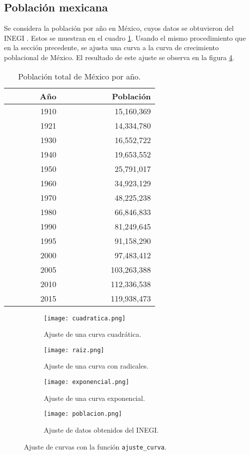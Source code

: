 \documentclass[12pt,letterpaper]{article}
\begin{document}
\subsection{Población mexicana}
Se considera la población por año en México, cuyos datos se obtuvieron del INEGI \cite{inegi}. Estos se muestran en el cuadro \ref{ine}. Usando el mismo procedimiento que en la sección precedente, se ajusta una curva a la curva de crecimiento poblacional de México. El resultado de este ajuste se observa en la figura \ref{pob}.
\begin{table}
\centering
\caption{Población total de México por año.}
\begin{tabular}{rr}
  \hline
 $\qquad \qquad$Año & $\qquad \qquad \qquad$Población \\ 
  \hline
 1910 & 15,160,369 \\ 
 1921 & 14,334,780 \\ 
 1930 & 16,552,722 \\ 
 1940 & 19,653,552 \\ 
 1950 & 25,791,017 \\ 
 1960 & 34,923,129 \\ 
 1970 & 48,225,238 \\ 
 1980 & 66,846,833 \\ 
 1990 & 81,249,645 \\ 
 1995 & 91,158,290\\ 
 2000 & 97,483,412 \\ 
 2005 & 103,263,388 \\ 
 2010 & 112,336,538 \\ 
 2015 & 119,938,473 \\ 
   \hline
\end{tabular}
\label{ine}
\end{table}

\begin{figure}
 	\centering 
 	\begin{subfigure}[b]{0.45\linewidth}
 		\texttt{[image: cuadratica.png]} 		
 		\caption{Ajuste de una curva cuadrática.}
 		 		\label{cuadratica}
 	\end{subfigure}
 	\begin{subfigure}[b]{0.45\linewidth}
 		\texttt{[image: raiz.png]} 		
 		\caption{Ajuste de una curva con radicales.}
 		\label{raiz}
 	\end{subfigure}
 	\begin{subfigure}[b]{0.45\linewidth}
 		\texttt{[image: exponencial.png]} 		
 		\caption{Ajuste de una curva exponencial.}
 		\label{exp}
 	\end{subfigure}
 	\begin{subfigure}[b]{0.45\linewidth}
 		\texttt{[image: poblacion.png]} 		
 		\caption{Ajuste de datos obtenidos del INEGI.}
 		\label{pob} 		
 	\end{subfigure}
 	 	\caption{Ajuste de curvas con la función \texttt{ajuste\_curva}.} 
 	 		\label{ajustecurva}
\end{figure}
\end{document}
